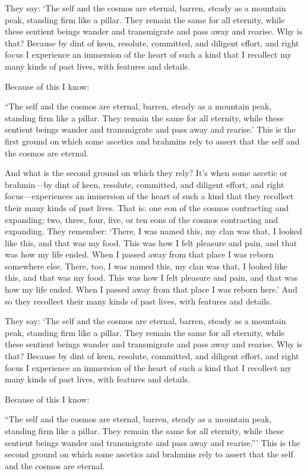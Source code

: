 \documentclass[12pt,openany]{book}%
\begin{document}
They say: ‘The self and the cosmos are eternal, barren, steady as a mountain peak, standing firm like a pillar. They remain the same for all eternity, while these sentient beings wander and transmigrate and pass away and rearise. Why is that? Because by dint of keen, resolute, committed, and diligent effort, and right focus I experience an immersion of the heart of such a kind that I recollect my many kinds of past lives, with features and details. 

Because of this I know: 

“The self and the cosmos are eternal, barren, steady as a mountain peak, standing firm like a pillar. They remain the same for all eternity, while these sentient beings wander and transmigrate and pass away and rearise.’ This is the first ground on which some ascetics and brahmins rely to assert that the self and the cosmos are eternal. 

And what is the second ground on which they rely? It’s when some ascetic or brahmin—by dint of keen, resolute, committed, and diligent effort, and right focus—experiences an immersion of the heart of such a kind that they recollect their many kinds of past lives. That is: one eon of the cosmos contracting and expanding; two, three, four, five, or ten eons of the cosmos contracting and expanding. They remember: ‘There, I was named this, my clan was that, I looked like this, and that was my food. This was how I felt pleasure and pain, and that was how my life ended. When I passed away from that place I was reborn somewhere else. There, too, I was named this, my clan was that, I looked like this, and that was my food. This was how I felt pleasure and pain, and that was how my life ended. When I passed away from that place I was reborn here.’ And so they recollect their many kinds of past lives, with features and details. 

They say: ‘The self and the cosmos are eternal, barren, steady as a mountain peak, standing firm like a pillar. They remain the same for all eternity, while these sentient beings wander and transmigrate and pass away and rearise. Why is that? Because by dint of keen, resolute, committed, and diligent effort, and right focus I experience an immersion of the heart of such a kind that I recollect my many kinds of past lives, with features and details. 

Because of this I know: 

“The self and the cosmos are eternal, barren, steady as a mountain peak, standing firm like a pillar. They remain the same for all eternity, while these sentient beings wander and transmigrate and pass away and rearise.”’ This is the second ground on which some ascetics and brahmins rely to assert that the self and the cosmos are eternal. 
\end{document}
